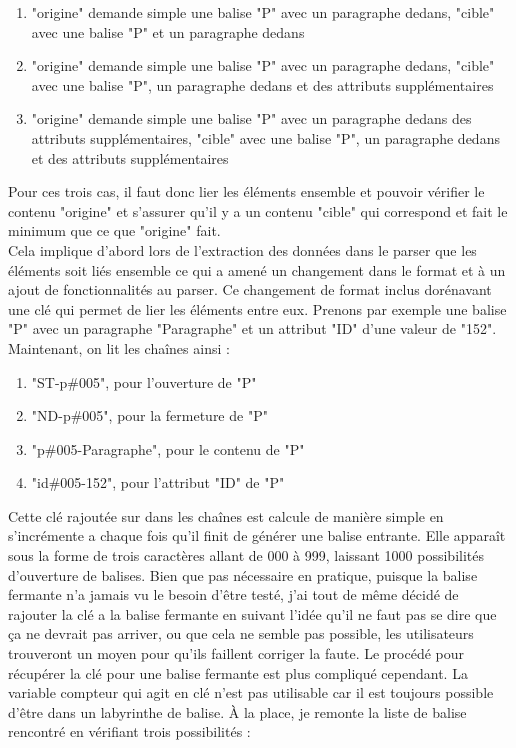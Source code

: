 \begin{enumerate}
\item "origine" demande simple une balise "P" avec un paragraphe dedans, "cible" avec une balise "P" et un paragraphe dedans
\item "origine" demande simple une balise "P" avec un paragraphe dedans, "cible" avec une balise "P", un paragraphe dedans et des attributs supplémentaires
\item "origine" demande simple une balise "P" avec un paragraphe dedans des attributs supplémentaires, "cible" avec une balise "P", un paragraphe dedans et des attributs supplémentaires\\
\end{enumerate}

Pour ces trois cas, il faut donc lier les éléments ensemble et pouvoir vérifier le contenu "origine" et s'assurer qu'il y a un contenu "cible" qui correspond et fait le minimum que ce que "origine" fait.\\

Cela implique d'abord lors de l'extraction des données dans le parser que les éléments soit liés ensemble ce qui a amené un changement dans le format et à un ajout de fonctionnalités au parser. Ce changement de format inclus dorénavant une clé qui permet de lier les éléments entre eux. Prenons par exemple une balise "P" avec un paragraphe "Paragraphe" et un attribut "ID" d'une valeur de "152". Maintenant, on lit les chaînes ainsi :\\

\begin{enumerate}
\item "ST-p\#005", pour l'ouverture de "P"
\item "ND-p\#005", pour la fermeture de "P"
\item "p\#005-Paragraphe", pour le contenu de "P"
\item "id\#005-152", pour l'attribut "ID" de "P"\\
\end{enumerate}

Cette clé rajoutée sur dans les chaînes est calcule de manière simple en s’incrémente a chaque fois qu'il finit de générer une balise entrante. Elle apparaît sous la forme de trois caractères allant de 000 à 999, laissant 1000 possibilités d'ouverture de balises. Bien que pas nécessaire en pratique, puisque la balise fermante n'a jamais vu le besoin d’être testé, j'ai tout de même décidé de rajouter la clé a la balise fermante en suivant l’idée qu'il ne faut pas se dire que ça ne devrait pas arriver, ou que cela ne semble pas possible, les utilisateurs trouveront un moyen pour qu'ils faillent corriger la faute. Le procédé pour récupérer la clé pour une balise fermante est plus compliqué cependant. La variable compteur qui agit en clé n'est pas utilisable car il est toujours possible d’être dans un labyrinthe de balise. À la place, je remonte la liste de balise rencontré en vérifiant trois possibilités :\\

